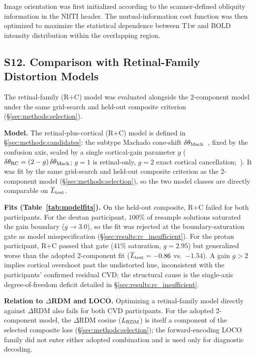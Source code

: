 Image orientation was first initialized according to the scanner-defined obliquity information in the NIfTI header.
The mutual-information cost function was then optimized to maximize the statistical dependence between T1w and BOLD intensity distribution within the overlapping region.



\subsection*{\textbf{S12. Comparison with Retinal-Family Distortion Models}}
\label{app:retinal_family}

The retinal-family (R+C) model was evaluated alongside the 2-component model under the same grid-search and held-out composite criterion (\S\ref{sec:methods:selection}).

\textbf{Model.} The retinal-plus-cortical (R+C) model is defined in \S\ref{sec:methods:candidates}: the subtype Machado cone-shift $\delta\theta_{\rm Mach}$~, fixed by the confusion axis, scaled by a single cortical-gain parameter $g$ ($\delta\theta_{\rm RC} = (2-g)\,\delta\theta_{\rm Mach}$; $g = 1$ is retinal-only, $g = 2$ exact cortical cancellation;~). It was fit by the same grid-search and held-out composite criterion as the 2-component model (\S\ref{sec:methods:selection}), so the two model classes are directly comparable on $\overline{L}_{\rm test}$.

\textbf{Fits (Table~\ref{tab:modelfits}).} On the held-out composite, R+C failed for both participants. For the deutan participant, $100\%$ of resample solutions saturated the gain boundary ($g \to 3.0$), so the fit was rejected at the boundary-saturation gate as model misspecification (\S\ref{sec:results:rc_insufficient}). For the protan participant, R+C passed that gate ($41\%$ saturation, $g = 2.95$) but generalized worse than the adopted 2-component fit ($\overline{L}_{\rm test} = -0.86$ vs.\ $-1.54$). A gain $g > 2$ implies cortical overshoot past the undistorted hue, inconsistent with the participants' confirmed residual CVD; the structural cause is the single-axis degree-of-freedom deficit detailed in \S\ref{sec:results:rc_insufficient}.

\textbf{Relation to $\Delta$RDM and LOCO.} Optimizing a retinal-family model directly against $\Delta$RDM also fails for both CVD participants. For the adopted 2-component model, the $\Delta$RDM cosine ($L_{\rm RDM}$) is itself a component of the selected composite loss (\S\ref{sec:methods:selection}); the forward-encoding LOCO family did not enter either adopted combination and is used only for diagnostic decoding.

